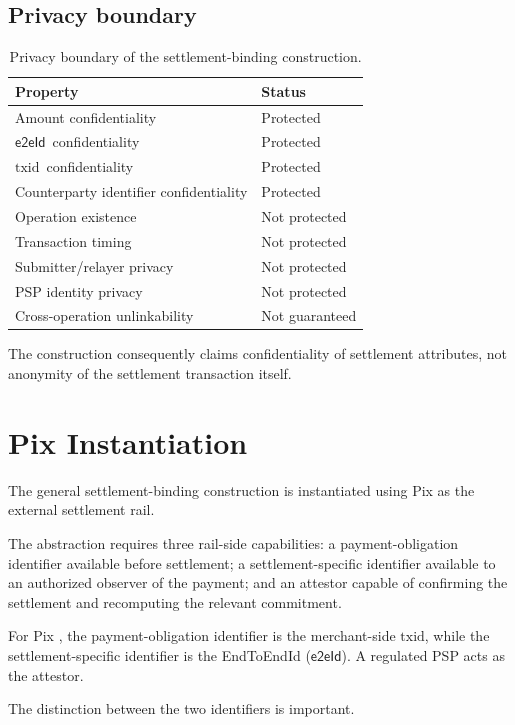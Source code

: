 \documentclass[10pt,twocolumn]{article}
\newcommand{\eeid}{\ensuremath{\mathsf{e2eId}}}
\newcommand{\txid}{\ensuremath{\text{txid}}}
\begin{document}
\subsection{Privacy boundary}

\begin{table}[t]
\centering
\begin{tabular}{@{}ll@{}}
\toprule
Property & Status \\
\midrule
Amount confidentiality & Protected \\
\eeid\ confidentiality & Protected \\
\txid\ confidentiality & Protected \\
Counterparty identifier confidentiality & Protected \\
Operation existence & Not protected \\
Transaction timing & Not protected \\
Submitter/relayer privacy & Not protected \\
PSP identity privacy & Not protected \\
Cross-operation unlinkability & Not guaranteed \\
\bottomrule
\end{tabular}
\caption{Privacy boundary of the settlement-binding construction.}
\end{table}

The construction consequently claims confidentiality of settlement
attributes, not anonymity of the settlement transaction itself.

\section{Pix Instantiation}
\label{sec:pix}

The general settlement-binding construction is instantiated using Pix as
the external settlement rail.

The abstraction requires three rail-side capabilities: a
payment-obligation identifier available before settlement; a
settlement-specific identifier available to an authorized observer of
the payment; and an attestor capable of confirming the settlement and
recomputing the relevant commitment.

For Pix \cite{spicatalog}, the payment-obligation identifier is the
merchant-side \txid, while the settlement-specific identifier is the
EndToEndId (\eeid). A regulated PSP acts as the attestor.

The distinction between the two identifiers is important.
\end{document}

